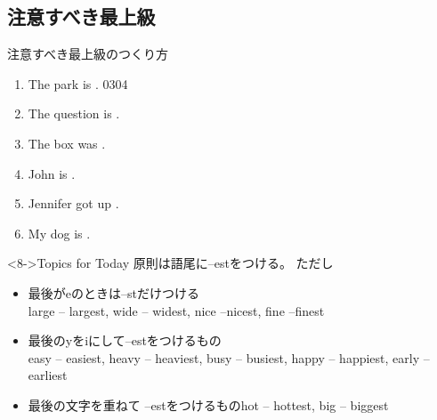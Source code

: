 \documentclass[aspectratio=169,xcolor={dvipsnames,table}]{beamer}
\begin{document}
\subsection{注意すべき最上級}
\begin{frame}[plain]{注意すべき最上級のつくり方}
 \begin{enumerate}
  \item<1-> The park is  .%
\hfill{\tiny 0304}\,{\scriptsize {}}
  \item<1-> The question is  .
  \item<1-> The box was  .
  \item<1-> John is  .
  \item<1-> Jennifer got up  .
  \item<1-> My dog is  .
 \end{enumerate}

\begin{block}<8->{Topics for Today}
{\small 原則は語尾に--estをつける。
ただし}
\begin{itemize}[square]\small
 \item 最後がeのときは--stだけつける\\\hfill{}large -- largest, wide -- widest, nice --nicest, fine --finest　
 \item 最後のyをiにして--estをつけるもの\\\hfill{}easy -- easiest, heavy -- heaviest, busy -- busiest, happy -- happiest, early -- earliest　
 \item 最後の文字を重ねて --estをつけるもの\hfill{}hot -- hottest, big -- biggest　

 \end{itemize}
     \end{block}
\end{frame}
\end{document}
